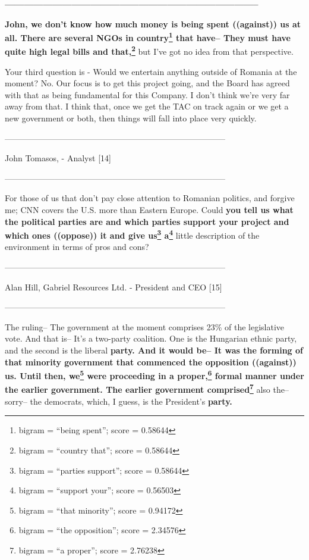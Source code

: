 \documentclass{article}
\begin{document}
 \textbf{--------------------------------------------------------------------------------} 

 \textbf{John, we don't know how much money is being spent ((against)) us at all. There are several NGOs in country\footnote{bigram = ``being spent''; score = 0.58644} that have-- They must have quite high legal bills and that,\footnote{bigram = ``country that''; score = 0.58644}} but I've got no idea from that perspective. 

 Your third question is - Would we entertain anything outside of Romania at the moment? No. Our focus is to get this project going, and the Board has agreed with that as being fundamental for this Company. I don't think we're very far away from that. I think that, once we get the TAC on track again or we get a new government or both, then things will fall into place very quickly. 

 -------------------------------------------------------------------------------- 

 John Tomasos, - Analyst [14] 

 -------------------------------------------------------------------------------- 

 For those of us that don't pay close attention to Romanian politics, and forgive me; CNN covers the U.S. more than Eastern Europe. Could \textbf{you tell us what the political parties are and which parties support your project and which ones ((oppose)) it and give us\footnote{bigram = ``parties support''; score = 0.58644} a\footnote{bigram = ``support your''; score = 0.56503}} little description of the environment in terms of pros and cons? 

 -------------------------------------------------------------------------------- 

 Alan Hill, Gabriel Resources Ltd. - President and CEO [15] 

 -------------------------------------------------------------------------------- 

 The ruling-- The government at the moment comprises 23\% of the legislative vote. And that is-- It's a two-party coalition. One is the Hungarian ethnic party, and the second is the liberal \textbf{party. And it would be-- It was the forming of that minority government that commenced the opposition ((against)) us. Until then, we\footnote{bigram = ``that minority''; score = 0.94172} were proceeding in a proper,\footnote{bigram = ``the opposition''; score = 2.34576} formal manner under the earlier government. The earlier government comprised\footnote{bigram = ``a proper''; score = 2.76238}} also the-- sorry-- the democrats, which, I guess, is the President's \textbf{party.} 
\end{document}
